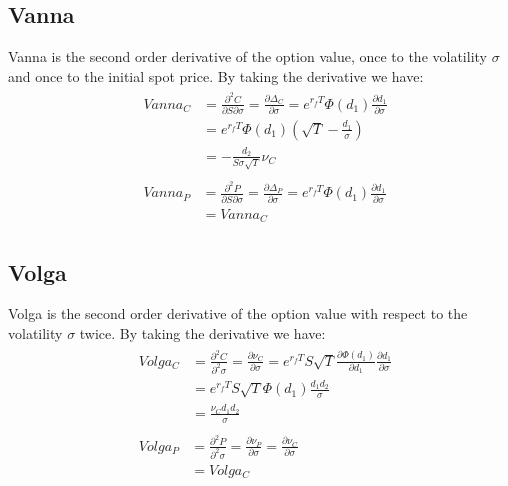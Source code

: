 \subsection{Vanna}
Vanna is the second order derivative of the option value, once to the volatility $\sigma$ and once to the initial spot price. \newline
By taking the derivative we have:
\begin{align}
&\begin{aligned}
Vanna_C &= \frac{\partial^2 C}{\partial S \partial \sigma} = \frac{\partial \Delta_C}{\partial \sigma} = e^{r_fT}\varPhi(d_1)\frac{\partial d_1}{\partial \sigma} \\
&= e^{r_fT}\varPhi(d_1)\left( \sqrt{T} - \frac{d_1}{\sigma}\right) \\
&= -\frac{d_2}{S\sigma \sqrt{T}}\nu_C
\end{aligned} \\
&\begin{aligned}
Vanna_P &= \frac{\partial^2 P}{\partial S \partial \sigma} = \frac{\partial \Delta_P}{\partial \sigma} = e^{r_fT}\varPhi(d_1)\frac{\partial d_1}{\partial \sigma} \\
&= Vanna_C
\end{aligned}
\end{align}

\subsection{Volga}
Volga is the second order derivative of the option value with respect to the volatility $\sigma$ twice. \newline
By taking the derivative we have:
\begin{align}
&\begin{aligned}
Volga_C &= \frac{\partial^2 C}{\partial^2 \sigma} = \frac{\partial \nu_C}{\partial \sigma} = e^{r_fT}S\sqrt{T}\frac{\partial \varPhi(d_1)}{\partial d_1}\frac{\partial d_1}{\partial \sigma} \\
&= e^{r_fT}S\sqrt{T}\varPhi(d_1)\frac{d_1d_2}{\sigma} \\
&= \frac{\nu_C d_1d_2}{\sigma}
\end{aligned} \\
&\begin{aligned}
Volga_P &= \frac{\partial^2 P}{\partial^2 \sigma} = \frac{\partial \nu_P}{\partial \sigma} = \frac{\partial \nu_C}{\partial \sigma}  \\
&= Volga_C
\end{aligned}
\end{align}

